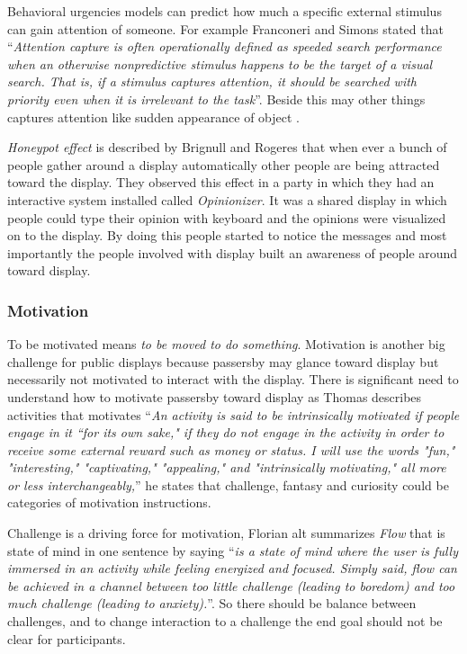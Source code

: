 Behavioral urgencies models can predict how much a specific external stimulus can gain attention of someone. For example Franconeri and Simons \cite{franconeri} stated that ``\emph{Attention capture is often operationally defined as speeded search performance when an otherwise nonpredictive stimulus happens to be the target of a visual search. That is, if a stimulus captures attention, it should be searched with priority even when it is irrelevant to the task}''. Beside this may other things captures attention like sudden appearance of object \cite{capturingattention}.

\emph{Honeypot effect} is described by Brignull and Rogeres \cite{EnticingPeople} that when ever a bunch of people gather around a display automatically other people are being attracted toward the display. They observed this effect in a party in which they had an interactive system installed called \emph{Opinionizer}. It was a shared display in which people could type their opinion with keyboard and the opinions were visualized on to the display. By doing this people started to notice the messages and most importantly the people involved with display built an awareness of people around toward display.


\subsubsection{Motivation}
To be motivated means \emph{to be moved to do something}\cite{motiv}.
Motivation is another big challenge for public displays because passersby may glance toward display but necessarily not motivated to interact with the display. There is significant need to understand how to motivate passersby toward display as Thomas \cite{toward_motivation} describes activities that motivates ``\emph{An activity is said to be intrinsically motivated if people engage in it “for its own sake," if they do not engage in the activity in order to receive some external reward such as money or status. I will use the words "fun," "interesting," "captivating," "appealing," and "intrinsically motivating," all more or less interchangeably,}'' he states that challenge, fantasy and curiosity could be categories of motivation instructions.

Challenge is a driving force for motivation, Florian alt \cite{pervasiv_ad} summarizes \emph{Flow}\cite{flow} that is state of mind in one sentence by saying ``\emph{is a state of mind where the user is fully immersed in an activity while feeling energized and focused. Simply said, flow can be achieved in a channel between too little challenge (leading to boredom) and too much challenge (leading to anxiety).}''. So there should be balance between challenges, and to change interaction to a challenge the end goal should not be clear for participants.   

